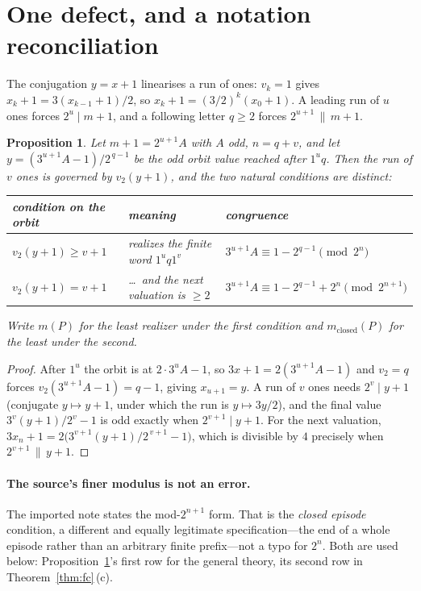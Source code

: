 \documentclass[11pt,a4paper]{article}
\theoremstyle{plain}
\newtheorem{proposition}{Proposition}
\theoremstyle{definition}
\begin{document}
\section{One defect, and a notation reconciliation}\label{sec:tworun}

The conjugation $y=x+1$ linearises a run of ones: $v_k=1$ gives
$x_k+1=3(x_{k-1}+1)/2$, so $x_k+1=(3/2)^k(x_0+1)$. A leading run of $u$ ones
forces $2^{u}\mid m+1$, and a following letter $q\ge 2$ forces
$2^{u+1}\,\|\,m+1$.

\begin{proposition}\label{prop:tworun}
Let $m+1=2^{u+1}A$ with $A$ odd, $n=q+v$, and let
$y=(3^{u+1}A-1)/2^{\,q-1}$ be the odd orbit value reached after $1^{u}q$.
Then the run of $v$ ones is governed by $v_2(y+1)$, and the two natural
conditions are \emph{distinct}:
\begin{center}\small
\begin{tabular}{@{}lll@{}}
\toprule
condition on the orbit & meaning & congruence\\
\midrule
$v_2(y+1)\ge v+1$ & realizes the finite word $1^{u}q1^{v}$
  & $3^{u+1}A\equiv 1-2^{q-1}\pmod{2^{n}}$\\
$v_2(y+1)=v+1$ & \dots\ and the next valuation is $\ge2$
  & $3^{u+1}A\equiv 1-2^{q-1}+2^{n}\pmod{2^{n+1}}$\\
\bottomrule
\end{tabular}
\end{center}
Write $m(P)$ for the least realizer under the first condition and
$m_{\mathrm{closed}}(P)$ for the least under the second.
\end{proposition}

\begin{proof}
After $1^{u}$ the orbit is at $2\cdot3^{u}A-1$, so
$3x+1=2(3^{u+1}A-1)$ and $v_2=q$ forces $v_2(3^{u+1}A-1)=q-1$, giving
$x_{u+1}=y$. A run of $v$ ones needs $2^{v}\mid y+1$ (conjugate $y\mapsto y+1$,
under which the run is $y\mapsto 3y/2$), and the final value
$3^{v}(y+1)/2^{v}-1$ is odd exactly when $2^{v+1}\mid y+1$. For the next
valuation, $3x_n+1=2\bigl(3^{v+1}(y+1)/2^{\,v+1}-1\bigr)$, which is divisible
by $4$ precisely when $2^{v+1}\,\|\,y+1$.
\end{proof}

\paragraph{The source's finer modulus is not an error.}
The imported note states the mod-$2^{n+1}$ form. That is the \emph{closed
episode} condition, a different and equally legitimate specification---the end
of a whole episode rather than an arbitrary finite prefix---not a typo for
$2^{n}$. Both are used below: Proposition~\ref{prop:tworun}'s first row for the
general theory, its second row in Theorem~\ref{thm:fc}\,(c).
\end{document}
